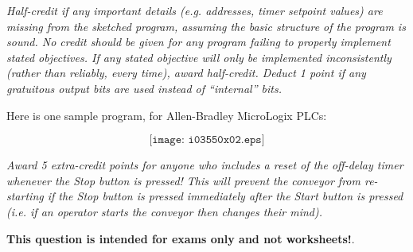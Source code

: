 





{\it Half-credit if any important details (e.g. addresses, timer setpoint values) are missing from the sketched program, assuming the basic structure of the program is sound.  No credit should be given for any program failing to properly implement  stated objectives.  If any stated objective will only be implemented inconsistently (rather than reliably, every time), award half-credit.  Deduct 1 point if any gratuitous output bits are used instead of ``internal'' bits.}

\vskip 10pt

Here is one sample program, for Allen-Bradley MicroLogix PLCs:

$$\texttt{[image: i03550x02.eps]}$$

{\it Award 5 extra-credit points for anyone who includes a reset of the off-delay timer whenever the Stop button is pressed!  This will prevent the conveyor from re-starting if the Stop button is pressed immediately after the Start button is pressed (i.e. if an operator starts the conveyor then changes their mind).}







{\bf This question is intended for exams only and not worksheets!}.


